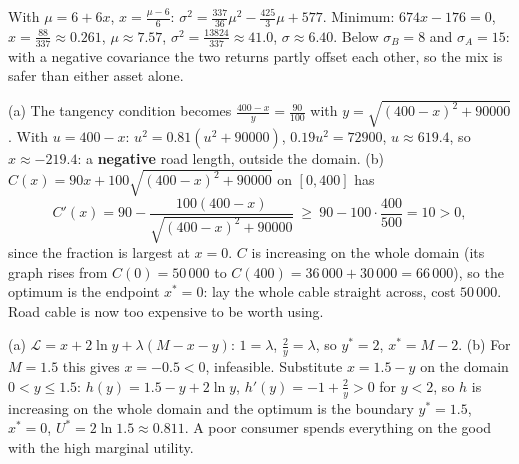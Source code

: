 \begin{solutions}
        With $\mu=6+6x$, $x=\tfrac{\mu-6}{6}$:
        $\sigma^{2}=\tfrac{337}{36}\mu^{2}-\tfrac{425}{3}\mu+577$.
        Minimum: $674x-176=0$, $x=\tfrac{88}{337}\approx0.261$,
        $\mu\approx7.57$, $\sigma^{2}=\tfrac{13824}{337}\approx41.0$,
        $\sigma\approx6.40$. Below $\sigma_B=8$ and $\sigma_A=15$: with a
        negative covariance the two returns partly offset each other, so
        the mix is safer than either asset alone.
  \item (a) The tangency condition becomes
        $\tfrac{400-x}{y}=\tfrac{90}{100}$ with $y=\sqrt{(400-x)^{2}+90000}$.
        With $u=400-x$: $u^{2}=0.81(u^{2}+90000)$, $0.19u^{2}=72900$,
        $u\approx619.4$, so $x\approx-219.4$: a \textbf{negative} road
        length, outside the domain. (b)
        $C(x)=90x+100\sqrt{(400-x)^{2}+90000}$ on $[0,400]$ has
        \[
          C'(x)=90-\frac{100(400-x)}{\sqrt{(400-x)^{2}+90000}}
          \ \ge\ 90-100\cdot\frac{400}{500}=10>0,
        \]
        since the fraction is largest at $x=0$. $C$ is increasing on the
        whole domain (its graph rises from $C(0)=50\,000$ to
        $C(400)=36\,000+30\,000=66\,000$), so the optimum is the endpoint
        $x^*=0$: lay the whole cable straight across, cost $50\,000$. Road
        cable is now too expensive to be worth using.
  \item (a) $\mathcal{L}=x+2\ln y+\lambda(M-x-y)$: $1=\lambda$,
        $\tfrac2y=\lambda$, so $y^*=2$, $x^*=M-2$. (b) For $M=1.5$ this gives
        $x=-0.5<0$, infeasible. Substitute $x=1.5-y$ on the domain
        $0<y\le1.5$: $h(y)=1.5-y+2\ln y$, $h'(y)=-1+\tfrac2y>0$ for $y<2$, so
        $h$ is increasing on the whole domain and the optimum is the
        boundary $y^*=1.5$, $x^*=0$, $U^*=2\ln1.5\approx0.811$. A poor
        consumer spends everything on the good with the high marginal
        utility.
\end{solutions}
